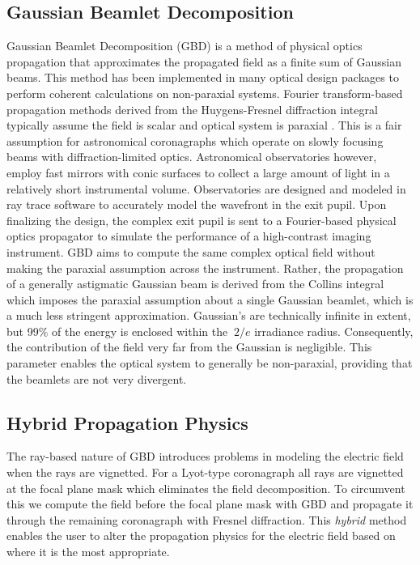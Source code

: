 \subsection{Gaussian Beamlet Decomposition}

Gaussian Beamlet Decomposition (GBD) is a method of physical optics propagation that approximates the propagated field as a finite sum of Gaussian beams. This method has been implemented in many optical design packages \cite{greynolds_ten_2020} to perform coherent calculations on non-paraxial systems. Fourier transform-based propagation methods derived from the Huygens-Fresnel diffraction integral typically assume the field is scalar and optical system is paraxial \cite{goodman17}. This is a fair assumption for astronomical coronagraphs which operate on slowly focusing beams with diffraction-limited optics. Astronomical observatories however, employ fast mirrors with conic surfaces to collect a large amount of light in a relatively short instrumental volume. Observatories are designed and modeled in ray trace software to accurately model the wavefront in the exit pupil. Upon finalizing the design, the complex exit pupil is sent to a Fourier-based physical optics propagator to simulate the performance of a high-contrast imaging instrument. GBD aims to compute the same complex optical field without making the paraxial assumption across the instrument. Rather, the propagation of a generally astigmatic Gaussian beam is derived from the Collins integral\cite{collins,cai_decentered_nodate} which imposes the paraxial assumption about a single Gaussian beamlet, which is a much less stringent approximation. Gaussian's are technically infinite in extent, but 99$\%$ of the energy is enclosed within the $~ 2/e$ irradiance radius. Consequently, the contribution of the field very far from the Gaussian is negligible. This parameter enables the optical system to generally be non-paraxial, providing that the beamlets are not very divergent\cite{Harvey15}.

\subsection{Hybrid Propagation Physics}

The ray-based nature of GBD introduces problems in modeling the electric field when the rays are vignetted. For a Lyot-type coronagraph all rays are vignetted at the focal plane mask which eliminates the field decomposition. To circumvent this we compute the field before the focal plane mask with GBD and propagate it through the remaining coronagraph with Fresnel diffraction. This \emph{hybrid} method enables the user to alter the propagation physics for the electric field based on where it is the most appropriate.


